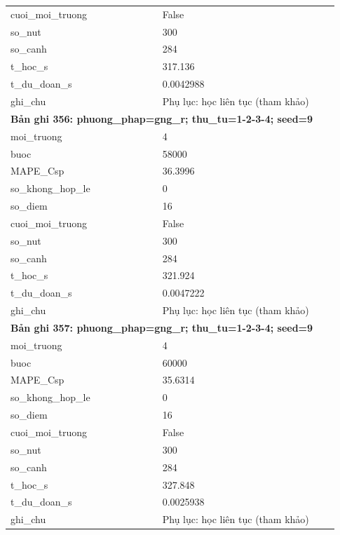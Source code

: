 \begin{longtable}{p{0.43\linewidth}p{0.50\linewidth}}
cuoi\_\allowbreak moi\_\allowbreak truong & False \\
so\_\allowbreak nut & 300 \\
so\_\allowbreak canh & 284 \\
t\_\allowbreak hoc\_\allowbreak s & 317.136 \\
t\_\allowbreak du\_\allowbreak doan\_\allowbreak s & 0.0042988 \\
ghi\_\allowbreak chu & Phụ lục: học liên tục (tham khảo) \\
\midrule
\multicolumn{2}{p{0.95\linewidth}}{\textbf{Bản ghi 356: phuong\_phap=gng\_r; thu\_tu=1-2-3-4; seed=9}} \\
moi\_\allowbreak truong & 4 \\
buoc & 58000 \\
MAPE\_\allowbreak Csp & 36.3996 \\
so\_\allowbreak khong\_\allowbreak hop\_\allowbreak le & 0 \\
so\_\allowbreak diem & 16 \\
cuoi\_\allowbreak moi\_\allowbreak truong & False \\
so\_\allowbreak nut & 300 \\
so\_\allowbreak canh & 284 \\
t\_\allowbreak hoc\_\allowbreak s & 321.924 \\
t\_\allowbreak du\_\allowbreak doan\_\allowbreak s & 0.0047222 \\
ghi\_\allowbreak chu & Phụ lục: học liên tục (tham khảo) \\
\midrule
\multicolumn{2}{p{0.95\linewidth}}{\textbf{Bản ghi 357: phuong\_phap=gng\_r; thu\_tu=1-2-3-4; seed=9}} \\
moi\_\allowbreak truong & 4 \\
buoc & 60000 \\
MAPE\_\allowbreak Csp & 35.6314 \\
so\_\allowbreak khong\_\allowbreak hop\_\allowbreak le & 0 \\
so\_\allowbreak diem & 16 \\
cuoi\_\allowbreak moi\_\allowbreak truong & False \\
so\_\allowbreak nut & 300 \\
so\_\allowbreak canh & 284 \\
t\_\allowbreak hoc\_\allowbreak s & 327.848 \\
t\_\allowbreak du\_\allowbreak doan\_\allowbreak s & 0.0025938 \\
ghi\_\allowbreak chu & Phụ lục: học liên tục (tham khảo) \\

\end{longtable}
